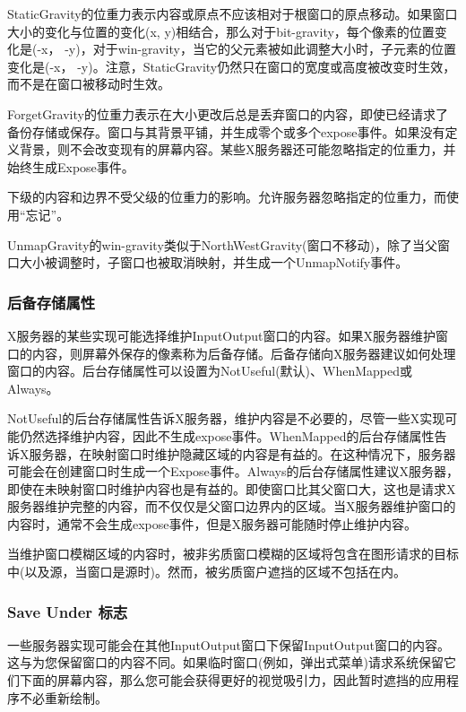 StaticGravity的位重力表示内容或原点不应该相对于根窗口的原点移动。如果窗口大小的变化与位置的变化(x, y)相结合，那么对于bit-gravity，每个像素的位置变化是(-x， -y)，对于win-gravity，当它的父元素被如此调整大小时，子元素的位置变化是(-x， -y)。注意，StaticGravity仍然只在窗口的宽度或高度被改变时生效，而不是在窗口被移动时生效。

ForgetGravity的位重力表示在大小更改后总是丢弃窗口的内容，即使已经请求了备份存储或保存。窗口与其背景平铺，并生成零个或多个expose事件。如果没有定义背景，则不会改变现有的屏幕内容。某些X服务器还可能忽略指定的位重力，并始终生成Expose事件。

下级的内容和边界不受父级的位重力的影响。允许服务器忽略指定的位重力，而使用“忘记”。

UnmapGravity的win-gravity类似于NorthWestGravity(窗口不移动)，除了当父窗口大小被调整时，子窗口也被取消映射，并生成一个UnmapNotify事件。

\subsubsection{后备存储属性}

X服务器的某些实现可能选择维护InputOutput窗口的内容。如果X服务器维护窗口的内容，则屏幕外保存的像素称为后备存储。后备存储向X服务器建议如何处理窗口的内容。后台存储属性可以设置为NotUseful(默认)、WhenMapped或Always。

NotUseful的后台存储属性告诉X服务器，维护内容是不必要的，尽管一些X实现可能仍然选择维护内容，因此不生成expose事件。WhenMapped的后台存储属性告诉X服务器，在映射窗口时维护隐藏区域的内容是有益的。在这种情况下，服务器可能会在创建窗口时生成一个Expose事件。Always的后台存储属性建议X服务器，即使在未映射窗口时维护内容也是有益的。即使窗口比其父窗口大，这也是请求X服务器维护完整的内容，而不仅仅是父窗口边界内的区域。当X服务器维护窗口的内容时，通常不会生成expose事件，但是X服务器可能随时停止维护内容。

当维护窗口模糊区域的内容时，被非劣质窗口模糊的区域将包含在图形请求的目标中(以及源，当窗口是源时)。然而，被劣质窗户遮挡的区域不包括在内。

\subsubsection{Save Under 标志}

一些服务器实现可能会在其他InputOutput窗口下保留InputOutput窗口的内容。这与为您保留窗口的内容不同。如果临时窗口(例如，弹出式菜单)请求系统保留它们下面的屏幕内容，那么您可能会获得更好的视觉吸引力，因此暂时遮挡的应用程序不必重新绘制。


